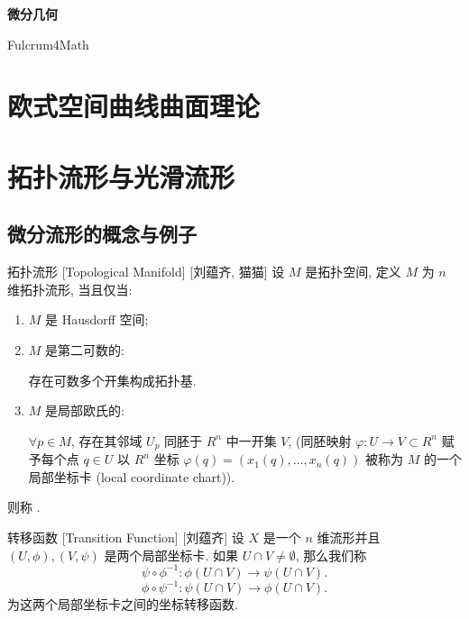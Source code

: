 \documentclass[UTF8]{ctexart}
\begin{document}
\begin{center}
    {\LARGE\textbf{微分几何}}

    Fulcrum4Math
\end{center}

\tableofcontents

\newpage
    
\section{欧式空间曲线曲面理论}

\newpage
    
\section{拓扑流形与光滑流形}

    \subsection{微分流形的概念与例子}
    
        \begin{dfn}
            {拓扑流形}
            [Topological Manifold]
            [刘蕴齐, 猫猫]
            设 \(M\) 是拓扑空间, 定义 \(M\) 为 \(n\) 维拓扑流形, 当且仅当: 
            \begin{enumerate}
                \item \(M\) 是 Hausdorff 空间; 
                \item \(M\) 是第二可数的: 
                
                存在可数多个开集构成拓扑基. 
                
                \item \(M\) 是局部欧氏的: 
                
                \(\forall p \in M \), 存在其邻域 \(U_p\) 同胚于  \(R^n\)  中一开集  \(V\),
                (同胚映射 \(\varphi: U \rightarrow V \subset R^n \)  赋予每个点  \(q \in U\)  以  \(R^n\)  坐标 \(\varphi(q)=(x_1(q), \dots,x_n(q))\)  被称为  \(M\)  的一个局部坐标卡 (local coordinate chart)). 
            \end{enumerate}
        则称 . 
        \end{dfn}

        \begin{dfn}
            {转移函数}
            [Transition Function]
            [刘蕴齐]
            设  \(X\)  是一个  \(n\)  维流形并且  \((U, \phi), (V, \psi)\) 是两个局部坐标卡.  
            如果  \(U \cap V \neq \emptyset\), 那么我们称
            \[ \psi \circ \phi^{-1}: \phi(U \cap V) \rightarrow \psi(U \cap V). \]
            \[ \phi \circ \psi^{-1}:\psi(U \cap V) \rightarrow \phi(U \cap V).  \]
            为这两个局部坐标卡之间的坐标转移函数. 
        \end{dfn}
\end{document}
